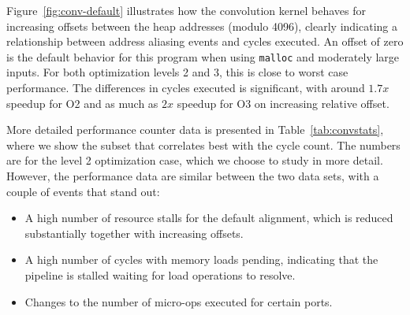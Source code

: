 \documentclass[10pt, conference, compsocconf]{IEEEtran}
\begin{document}
Figure~\ref{fig:conv-default} illustrates how the convolution kernel behaves for increasing offsets between the heap addresses (modulo 4096), clearly indicating a relationship between address aliasing events and cycles executed.
An offset of zero is the default behavior for this program when using \texttt{malloc} and moderately large inputs.
For both optimization levels 2 and 3, this is close to worst case performance.
The differences in cycles executed is significant, with around $1.7x$ speedup for O2 and as much as $2x$ speedup for O3 on increasing relative offset.

More detailed performance counter data is presented in Table~\ref{tab:convstats}, where we show the subset that correlates best with the cycle count.
The numbers are for the level 2 optimization case, which we choose to study in more detail.
However, the performance data are similar between the two data sets, with a couple of events that stand out:
\begin{itemize}
    \item A high number of resource stalls for the default alignment, which is reduced substantially together with increasing offsets. 
    \item A high number of cycles with memory loads pending, indicating that the pipeline is stalled waiting for load operations to resolve.
    \item Changes to the number of micro-ops executed for certain ports.
\end{itemize}
\end{document}
